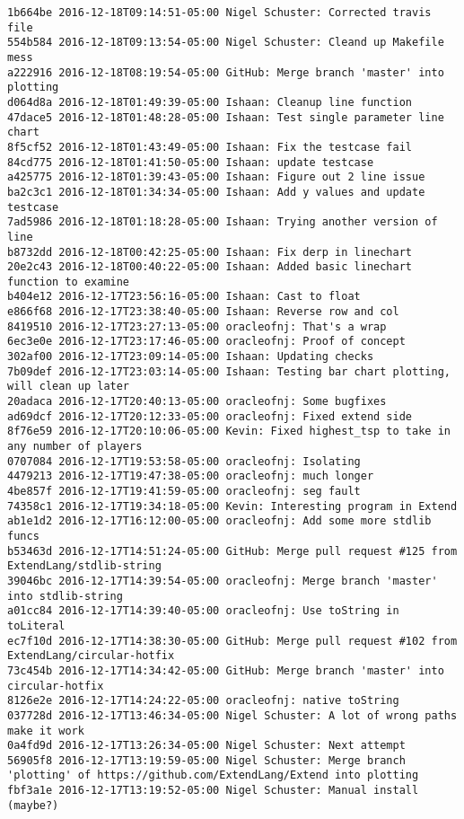 \begin{lstlisting}
1b664be 2016-12-18T09:14:51-05:00 Nigel Schuster: Corrected travis file
554b584 2016-12-18T09:13:54-05:00 Nigel Schuster: Cleand up Makefile mess
a222916 2016-12-18T08:19:54-05:00 GitHub: Merge branch 'master' into plotting
d064d8a 2016-12-18T01:49:39-05:00 Ishaan: Cleanup line function
47dace5 2016-12-18T01:48:28-05:00 Ishaan: Test single parameter line chart
8f5cf52 2016-12-18T01:43:49-05:00 Ishaan: Fix the testcase fail
84cd775 2016-12-18T01:41:50-05:00 Ishaan: update testcase
a425775 2016-12-18T01:39:43-05:00 Ishaan: Figure out 2 line issue
ba2c3c1 2016-12-18T01:34:34-05:00 Ishaan: Add y values and update testcase
7ad5986 2016-12-18T01:18:28-05:00 Ishaan: Trying another version of line
b8732dd 2016-12-18T00:42:25-05:00 Ishaan: Fix derp in linechart
20e2c43 2016-12-18T00:40:22-05:00 Ishaan: Added basic linechart function to examine
b404e12 2016-12-17T23:56:16-05:00 Ishaan: Cast to float
e866f68 2016-12-17T23:38:40-05:00 Ishaan: Reverse row and col
8419510 2016-12-17T23:27:13-05:00 oracleofnj: That's a wrap
6ec3e0e 2016-12-17T23:17:46-05:00 oracleofnj: Proof of concept
302af00 2016-12-17T23:09:14-05:00 Ishaan: Updating checks
7b09def 2016-12-17T23:03:14-05:00 Ishaan: Testing bar chart plotting, will clean up later
20adaca 2016-12-17T20:40:13-05:00 oracleofnj: Some bugfixes
ad69dcf 2016-12-17T20:12:33-05:00 oracleofnj: Fixed extend side
8f76e59 2016-12-17T20:10:06-05:00 Kevin: Fixed highest_tsp to take in any number of players
0707084 2016-12-17T19:53:58-05:00 oracleofnj: Isolating
4479213 2016-12-17T19:47:38-05:00 oracleofnj: much longer
4be857f 2016-12-17T19:41:59-05:00 oracleofnj: seg fault
74358c1 2016-12-17T19:34:18-05:00 Kevin: Interesting program in Extend
ab1e1d2 2016-12-17T16:12:00-05:00 oracleofnj: Add some more stdlib funcs
b53463d 2016-12-17T14:51:24-05:00 GitHub: Merge pull request #125 from ExtendLang/stdlib-string
39046bc 2016-12-17T14:39:54-05:00 oracleofnj: Merge branch 'master' into stdlib-string
a01cc84 2016-12-17T14:39:40-05:00 oracleofnj: Use toString in toLiteral
ec7f10d 2016-12-17T14:38:30-05:00 GitHub: Merge pull request #102 from ExtendLang/circular-hotfix
73c454b 2016-12-17T14:34:42-05:00 GitHub: Merge branch 'master' into circular-hotfix
8126e2e 2016-12-17T14:24:22-05:00 oracleofnj: native toString
037728d 2016-12-17T13:46:34-05:00 Nigel Schuster: A lot of wrong paths make it work
0a4fd9d 2016-12-17T13:26:34-05:00 Nigel Schuster: Next attempt
56905f8 2016-12-17T13:19:59-05:00 Nigel Schuster: Merge branch 'plotting' of https://github.com/ExtendLang/Extend into plotting
fbf3a1e 2016-12-17T13:19:52-05:00 Nigel Schuster: Manual install (maybe?)

\end{lstlisting}

